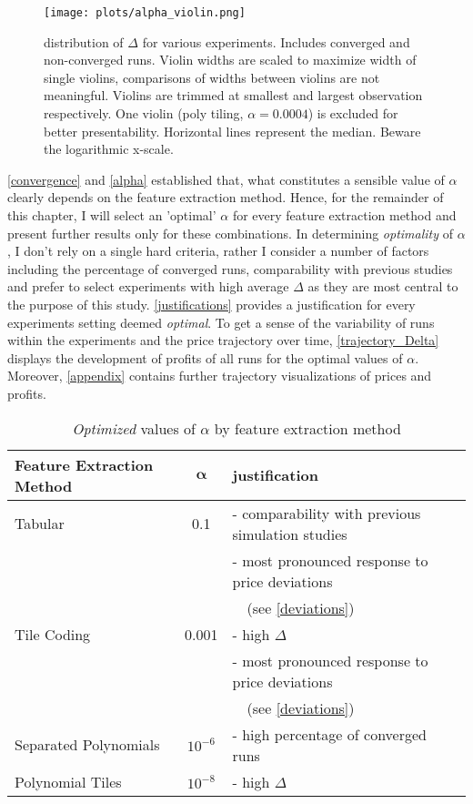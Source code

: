 \begin{figure}
	\texttt{[image: plots/alpha\_violin.png]}
	\caption{distribution of $\Delta$ for various experiments. Includes converged and non-converged runs. Violin widths are scaled to maximize width of single violins, comparisons of widths between violins are not meaningful. Violins are trimmed at smallest and largest observation respectively. One violin (poly tiling, $\alpha = 0.0004$) is excluded for better presentability. Horizontal lines represent the median. Beware the logarithmic x-scale.}
	\label{alpha_violin}
\end{figure}


\autoref{convergence} and \autoref{alpha} established that, what constitutes a sensible value of $\alpha$ clearly depends on the feature extraction method. Hence, for the remainder of this chapter, I will select an 'optimal' $\alpha$ for every feature extraction method and present further results only for these combinations. In determining \emph{optimality} of $\alpha$, I don't rely on a single hard criteria, rather I consider a number of factors including the percentage of converged runs, comparability with previous studies and prefer to select experiments with high average $\Delta$ as they are most central to the purpose of this study. \autoref{justifications} provides a justification for every experiments setting deemed \emph{optimal}. To get a sense of the variability of runs within the experiments and the price trajectory over time, \autoref{trajectory_Delta} displays the development of profits of all runs for the optimal values of $\alpha$. Moreover, \autoref{appendix} contains further trajectory visualizations of prices and profits.

\begin{center}
	\begin{table}
		
		\begin{tabular}{|l|c|l|}
			\hline
			\textbf{Feature Extraction Method}&$\boldsymbol{\alpha}$&\textbf{justification} \\
			\hline
			Tabular&0.1&- comparability with previous simulation studies \\
			&&- most pronounced response to price deviations \\
			&& \ \ (see \autoref{deviations}) \\
			\hline
			Tile Coding&0.001&- high $\Delta$ \\
			&&- most pronounced response to price deviations \\
			&&\ \ (see \autoref{deviations}) \\
			\hline
			Separated Polynomials&$10^{-6}$&- high percentage of converged runs \\
			\hline
			Polynomial Tiles&$10^{-8}$&- high $\Delta$ \\
			\hline
		\end{tabular}
		\caption{\emph{Optimized} values of $\alpha$ by feature extraction method}
		\label{justifications}
	\end{table}
\end{center}


